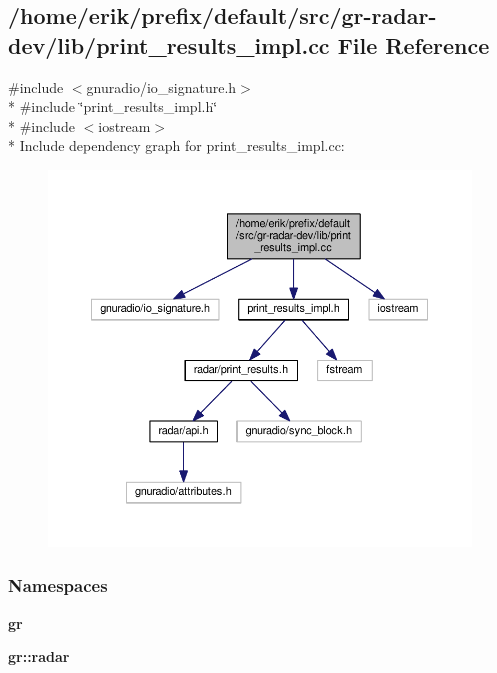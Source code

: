 \subsection{/home/erik/prefix/default/src/gr-\/radar-\/dev/lib/print\+\_\+results\+\_\+impl.cc File Reference}
\label{print__results__impl_8cc}
{\ttfamily \#include $<$gnuradio/io\+\_\+signature.\+h$>$}\\*
{\ttfamily \#include \char`\"{}print\+\_\+results\+\_\+impl.\+h\char`\"{}}\\*
{\ttfamily \#include $<$iostream$>$}\\*
Include dependency graph for print\+\_\+results\+\_\+impl.\+cc\+:
\nopagebreak
\begin{figure}[H]
\begin{center}
\leavevmode
\includegraphics[width=350pt]{dc/d7b/print__results__impl_8cc__incl}
\end{center}
\end{figure}
\subsubsection*{Namespaces}
\begin{DoxyCompactItemize}
\item 
 {\bf gr}
\item 
 {\bf gr\+::radar}
\end{DoxyCompactItemize}
